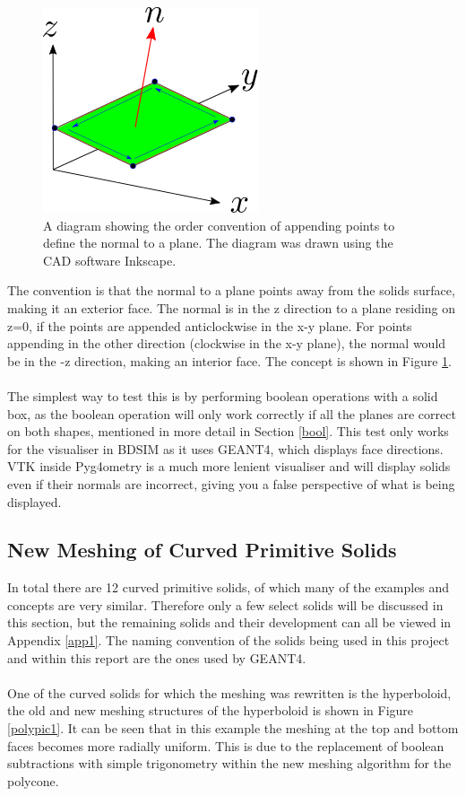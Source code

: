 \documentclass[12pt,a4paper]{article}
\begin{document}
\begin{figure}[h!]
\centering
\includegraphics[scale=0.7]{Images//append_points//Point_Appending_Order.png}
\caption[width=\columnwidth]{A diagram showing the order convention of appending points to define the normal to a plane. The diagram was drawn using the CAD software Inkscape.}
\label{pointsorder}
\end{figure}
\noindent The convention is that the normal to a plane points away from the solids surface, making it an exterior face. The normal is in the z direction to a plane residing on z=0, if the points are appended anticlockwise in the x-y plane. For points appending in the other direction (clockwise in the x-y plane), the normal would be in the -z direction, making an interior face. The concept is shown in Figure \ref{pointsorder}.
\\\\
The simplest way to test this is by performing boolean operations with a solid box, as the boolean operation will only work correctly if all the planes are correct on both shapes, mentioned in more detail in Section \ref{bool}. This test only works for the visualiser in BDSIM as it uses GEANT4, which displays face directions. VTK inside Pyg4ometry is a much more lenient visualiser and will display solids even if their normals are incorrect, giving you a false perspective of what is being displayed.

\subsection{New Meshing of Curved Primitive Solids}
In total there are 12 curved primitive solids, of which many of the examples and concepts are very similar. Therefore only a few select solids will be discussed in this section, but the remaining solids and their development can all be viewed in Appendix \ref{app1}. The naming convention of the solids being used in this project and within this report are the ones used by GEANT4.
\\\\
One of the curved solids for which the meshing was rewritten is the hyperboloid, the old and new meshing structures of the hyperboloid is shown in Figure \ref{polypic1}. It can be seen that in this example the meshing at the top and bottom faces becomes more radially uniform. This is due to the replacement of boolean subtractions with simple trigonometry within the new meshing algorithm for the polycone.
\\\\
\end{document}
